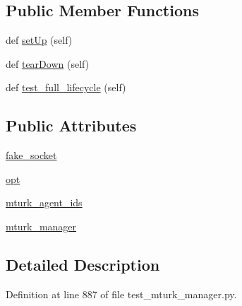 \subsection*{Public Member Functions}
\begin{DoxyCompactItemize}
\item 
def \hyperlink{classparlai_1_1mturk_1_1core_1_1dev_1_1test_1_1test__mturk__manager_1_1TestMTurkManagerLifecycleFunctions_aba5d51ff898867834346b0e91104d665}{set\+Up} (self)
\item 
def \hyperlink{classparlai_1_1mturk_1_1core_1_1dev_1_1test_1_1test__mturk__manager_1_1TestMTurkManagerLifecycleFunctions_ace4806b37df5bc022c7b33061d580746}{tear\+Down} (self)
\item 
def \hyperlink{classparlai_1_1mturk_1_1core_1_1dev_1_1test_1_1test__mturk__manager_1_1TestMTurkManagerLifecycleFunctions_a33dbbefd45dab90f29727329657e7767}{test\+\_\+full\+\_\+lifecycle} (self)
\end{DoxyCompactItemize}
\subsection*{Public Attributes}
\begin{DoxyCompactItemize}
\item 
\hyperlink{classparlai_1_1mturk_1_1core_1_1dev_1_1test_1_1test__mturk__manager_1_1TestMTurkManagerLifecycleFunctions_a4ab9d14a9af11d15eec48b95d9dea751}{fake\+\_\+socket}
\item 
\hyperlink{classparlai_1_1mturk_1_1core_1_1dev_1_1test_1_1test__mturk__manager_1_1TestMTurkManagerLifecycleFunctions_af1ac135ec91429e6729faab342eb2026}{opt}
\item 
\hyperlink{classparlai_1_1mturk_1_1core_1_1dev_1_1test_1_1test__mturk__manager_1_1TestMTurkManagerLifecycleFunctions_a42ea25be9d334c2cc753a39ce9131834}{mturk\+\_\+agent\+\_\+ids}
\item 
\hyperlink{classparlai_1_1mturk_1_1core_1_1dev_1_1test_1_1test__mturk__manager_1_1TestMTurkManagerLifecycleFunctions_a3152c56d23692852f6bb1901a8a5f2c4}{mturk\+\_\+manager}
\end{DoxyCompactItemize}


\subsection{Detailed Description}


Definition at line 887 of file test\+\_\+mturk\+\_\+manager.\+py.



